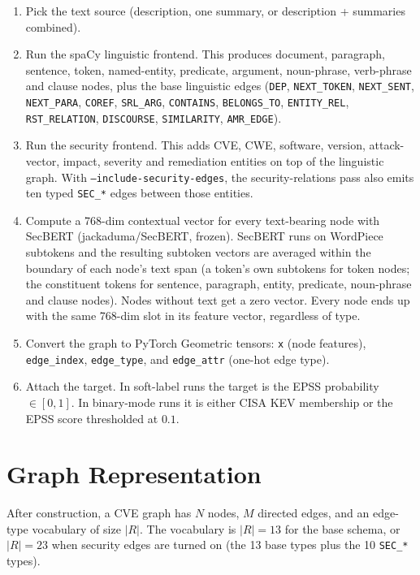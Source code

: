 \documentclass[11pt]{article}
\begin{document}
\begin{enumerate}
    \item Pick the text source (description, one summary, or
    description + summaries combined).
    \item Run the spaCy linguistic frontend. This produces document,
    paragraph, sentence, token, named-entity, predicate, argument,
    noun-phrase, verb-phrase and clause nodes, plus the base linguistic
    edges (\texttt{DEP}, \texttt{NEXT\_TOKEN}, \texttt{NEXT\_SENT},
    \texttt{NEXT\_PARA}, \texttt{COREF}, \texttt{SRL\_ARG},
    \texttt{CONTAINS}, \texttt{BELONGS\_TO}, \texttt{ENTITY\_REL},
    \texttt{RST\_RELATION}, \texttt{DISCOURSE}, \texttt{SIMILARITY},
    \texttt{AMR\_EDGE}).
    \item Run the security frontend. This adds CVE, CWE, software,
    version, attack-vector, impact, severity and remediation entities
    on top of the linguistic graph. With \texttt{--include-security-edges},
    the security-relations pass also emits ten typed \texttt{SEC\_*}
    edges between those entities.
    \item Compute a 768-dim contextual vector for every text-bearing
    node with SecBERT (jackaduma/SecBERT, frozen). SecBERT runs on
    WordPiece subtokens and the resulting subtoken vectors are
    averaged within the boundary of each node's text span (a token's
    own subtokens for token nodes; the constituent tokens for
    sentence, paragraph, entity, predicate, noun-phrase and clause
    nodes). Nodes without text get a zero vector. Every node ends up
    with the same 768-dim slot in its feature vector, regardless of
    type.
    \item Convert the graph to PyTorch Geometric tensors:
    \texttt{x} (node features), \texttt{edge\_index},
    \texttt{edge\_type}, and \texttt{edge\_attr} (one-hot edge type).
    \item Attach the target. In soft-label runs the target is the EPSS
    probability $\in [0, 1]$. In binary-mode runs it is either CISA
    KEV membership or the EPSS score thresholded at $0.1$.
\end{enumerate}

\section{Graph Representation}

After construction, a CVE graph has $N$ nodes, $M$ directed edges,
and an edge-type vocabulary of size $|R|$. The vocabulary is $|R| = 13$
for the base schema, or $|R| = 23$ when security edges are turned on
(the 13 base types plus the 10 \texttt{SEC\_*} types).
\end{document}
